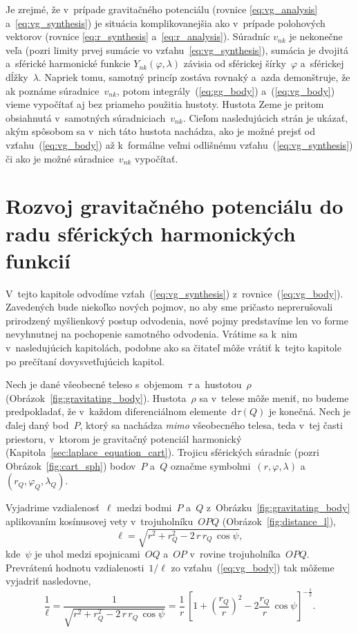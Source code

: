 \documentclass[a4paper,12pt]{book}
\newcommand{\diff}{\mathrm d}
\begin{document}
Je zrejmé, že v~prípade gravitačného potenciálu (rovnice \ref{eq:vg_analysis}
a~\ref{eq:vg_synthesis}) je situácia komplikovanejšia ako v~prípade polohových
vektorov (rovnice \ref{eq:r_synthesis} a~\ref{eq:r_analysis}).  Súradníc
$v_{nk}$ je nekonečne veľa (pozri limity prvej sumácie vo
vzťahu~\ref{eq:vg_synthesis}), sumácia je dvojitá a~sférické harmonické funkcie
$Y_{nk}(\varphi, \lambda)$ závisia od sférickej šírky~$\varphi$ a~sférickej
dĺžky~$\lambda$.  Napriek tomu, samotný princíp zostáva rovnaký a~azda
demonštruje, že ak poznáme súradnice~$v_{nk}$, potom
integrály~(\ref{eq:gg_body}) a~(\ref{eq:vg_body}) vieme vypočítať aj bez
priameho použitia hustoty.  Hustota Zeme je pritom obsiahnutá v~samotných
súradniciach~$v_{nk}$.  Cieľom nasledujúcich strán je ukázať, akým spôsobom sa
v~nich táto hustota nachádza, ako je možné prejsť od vzťahu~(\ref{eq:vg_body})
až k~formálne veľmi odlišnému vzťahu~(\ref{eq:vg_synthesis}) či ako je možné
súradnice~$v_{nk}$ vypočítať.



\section{Rozvoj gravitačného potenciálu do radu sférických harmonických
funkcií}
\label{sec:vg_sh_expansion}

V~tejto kapitole odvodíme vzťah~(\ref{eq:vg_synthesis})
z~rovnice~(\ref{eq:vg_body}).  Zavedených bude niekoľko nových pojmov, no aby 
sme pričasto neprerušovali prirodzený myšlienkový postup odvodenia, nové pojmy
predstavíme len vo forme nevyhnutnej na pochopenie samotného odvodenia.
Vrátime sa k~nim v~nasledujúcich kapitolách, podobne ako sa čitateľ môže vrátiť
k~tejto kapitole po prečítaní dovysvetľujúcich kapitol.

Nech je dané všeobecné teleso s~objemom~$\tau$ a~hustotou~$\rho$
(Obrázok~\ref{fig:gravitating_body}).  Hustota~$\rho$ sa v~telese môže meniť,
no budeme predpokladať, že v~každom diferenciálnom elemente~$\diff \tau(Q)$ je
konečná.  Nech je ďalej daný bod~$P$, ktorý sa nachádza \emph{mimo} všeobecného
telesa, teda v~tej časti priestoru, v~ktorom je gravitačný potenciál harmonický
(Kapitola~\ref{sec:laplace_equation_cart}).  Trojicu sférických súradníc (pozri
Obrázok~\ref{fig:cart_sph}) bodov~$P$ a~$Q$ označme symbolmi~$(r, \varphi,
\lambda)$ a~$(r_Q, \varphi_Q, \lambda_Q)$.

Vyjadrime vzdialenosť~$\ell$ medzi bodmi~$P$ a~$Q$
z~Obrázku~\ref{fig:gravitating_body} aplikovaním kosínusovej vety
v~trojuholníku~$OPQ$ (Obrázok~\ref{fig:distance_l}),
%
\begin{equation}
\label{eq:l_sph}
\ell = \sqrt{r^2 + r_Q^2 - 2 \, r \, r_Q \, \cos\psi}{,}
\end{equation}
%
kde~$\psi$ je uhol medzi spojnicami~$OQ$ a~$OP$ v~rovine trojuholníka~$OPQ$.
Prevrátenú hodnotu vzdialenosti~$1 \slash \ell$ zo vzťahu~(\ref{eq:vg_body}) 
tak môžeme vyjadriť nasledovne,
%
\begin{equation}
\label{eq:1l}
\frac{1}{\ell} = \frac{1}{\sqrt{ r^2 + r_Q^2 - 2 \, r \, r_Q \, \cos\psi
}} = \frac{1}{r} \, \left[1 + \left( \dfrac{r_Q}{r}
\right)^2 - 2 \dfrac{r_Q}{r} \, \cos\psi \right]^{-\frac{1}{2}}{.}
\end{equation}
\end{document}
